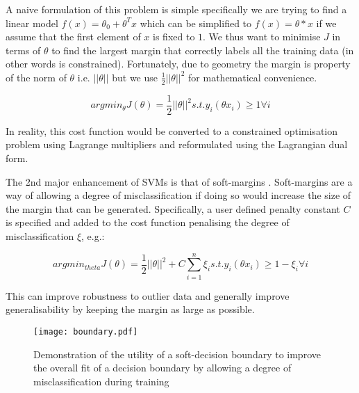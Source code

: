 A naive formulation of this problem is simple specifically we are trying to find a linear model \(f(x) = \theta_{0} + \theta^{T}x\) which can be simplified 
to \(f(x) = \theta * x \) if we assume that the first element of \(x\) is fixed to \(1\). We thus want to minimise \(J\) in terms of \(\theta\) to find
the largest margin that correctly labels all the training data (in other words is constrained).  Fortunately, due to geometry the margin is property of
the norm of \(\theta\) i.e. \(||\theta||\) but we use \(\frac{1}{2} ||\theta||^{2}\) for mathematical convenience.

\[argmin_{\theta} J(\theta) = \frac{1}{2} ||\theta||^{2} s.t. y_{i}(\theta x_{i}) \geq 1 \forall i\]

In reality, this cost function would be converted to a constrained optimisation problem using Lagrange multipliers and reformulated using the Lagrangian dual form. 


The 2nd major enhancement of SVMs is that of soft-margins \citep{Cortes1995}. Soft-margins are a way of allowing a degree of misclassification
if doing so would increase the size of the margin that can be generated.  Specifically, a user defined penalty constant \(C\) is specified and 
added to the cost function penalising the degree of misclassification \(\xi\), e.g.:

\[argmin_{theta} J(\theta) = \frac{1}{2} ||\theta||^{2}  + C \sum^{n}_{i=1} \xi_{i} s.t. y_{i}(\theta x_{i}) \geq 1 - \xi_{i} \forall i\]

This can improve robustness to outlier data and generally improve generalisability by keeping the margin as large as possible.

\begin{figure}[h]
    \texttt{[image: boundary.pdf]}
    \caption{Demonstration of the utility of a soft-decision boundary to improve the overall
    fit of a decision boundary by allowing a degree of misclassification during training}
    \label{fig:boundary}
\end{figure}

